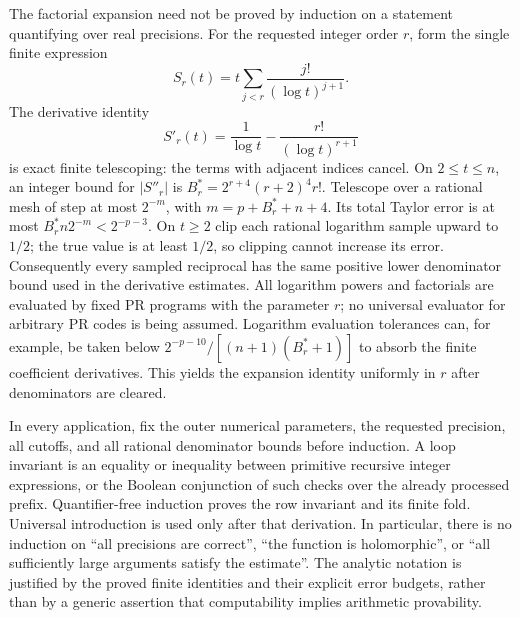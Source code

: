 The factorial expansion need not be proved by induction on a statement
quantifying over real precisions. For the requested integer order $r$,
form the single finite expression
\[
 S_r(t)=t\sum_{j<r}\frac{j!}{(\log t)^{j+1}}.
\]
The derivative identity
\[
 S'_r(t)=\frac1{\log t}-\frac{r!}{(\log t)^{r+1}}
\]
is exact finite telescoping: the terms with adjacent indices cancel.
On $2\le t\le n$, an integer bound for $|S''_r|$ is
$B_r^*=2^{r+4}(r+2)^4r!$. Telescope over a rational mesh of step
at most $2^{-m}$, with $m=p+B_r^*+n+4$. Its total Taylor error is
at most $B_r^*n2^{-m}<2^{-p-3}$.
On $t\ge2$ clip each rational logarithm sample upward to $1/2$;
the true value is at least $1/2$, so clipping cannot increase its error.
Consequently every sampled reciprocal has the same positive lower
denominator bound used in the derivative estimates.
All logarithm powers and factorials are evaluated by fixed PR programs
with the parameter $r$; no universal evaluator for arbitrary PR codes
is being assumed. Logarithm evaluation tolerances can, for example,
be taken below $2^{-p-10}/[(n+1)(B_r^*+1)]$ to absorb the finite
coefficient derivatives. This yields the expansion identity uniformly
in $r$ after denominators are cleared.

In every application, fix the outer numerical parameters, the requested
precision, all cutoffs, and all rational denominator bounds before
induction. A loop invariant is an equality or inequality between
primitive recursive integer expressions, or the Boolean conjunction of
such checks over the already processed prefix. Quantifier-free induction
proves the row invariant and its finite fold. Universal introduction is
used only after that derivation. In particular, there is no induction on
``all precisions are correct'', ``the function is holomorphic'', or
``all sufficiently large arguments satisfy the estimate''. The analytic
notation is justified by the proved finite identities and their explicit
error budgets, rather than by a generic assertion that computability
implies arithmetic provability.
